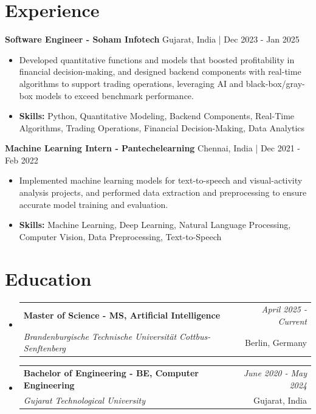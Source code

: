 \documentclass[a4paper,11pt]{article}
\makeatletter
\newcommand{\resumeSubheading}[4]{
\vspace{0.5mm}\item
    \begin{tabular*}{\linewidth}[t]{l@{\extracolsep{\fill}}r}
        \textbf{#1} & \textit{\footnotesize{#4}} \\
        \textit{\footnotesize{#3}} &  \footnotesize{#2}\\
    \end{tabular*}
    \vspace{-2.4mm}
}
\makeatother
\begin{document}
\section{\textbf{Experience}}


\vspace{1mm}
  \textbf{Software Engineer - Soham Infotech} \hfill Gujarat, India | Dec 2023 - Jan 2025
\vspace{-1.5mm} %
\begin{itemize}
  \item Developed quantitative functions and models that boosted profitability in financial decision-making, and designed backend components with real-time algorithms to support trading operations, leveraging AI and black-box/gray-box models to exceed benchmark performance.

\vspace{-2mm}
  \item \textbf{Skills:} Python, Quantitative Modeling, Backend Components, Real-Time Algorithms, Trading Operations, Financial Decision-Making, Data Analytics
\end{itemize}

\vspace{1mm}
  \textbf{Machine Learning Intern - Pantechelearning} \hfill Chennai, India | Dec 2021 - Feb 2022
\vspace{-1.5mm} %
\begin{itemize}
  \item Implemented machine learning models for text-to-speech and visual-activity analysis projects, and performed data extraction and preprocessing to ensure accurate model training and evaluation.
\vspace{-2mm}
  \item \textbf{Skills:} Machine Learning, Deep Learning, Natural Language Processing, Computer Vision, Data Preprocessing, Text-to-Speech
\end{itemize}\section{\textbf{Education}}
\vspace{-0.4mm}

\begin{itemize}[leftmargin=0.15in, label={}]
\resumeSubheading
{Master of Science - MS, Artificial Intelligence }{Berlin, Germany}
{Brandenburgische Technische Universität Cottbus-Senftenberg  }{April 2025 - Current}

\vspace{1.0mm} %
\resumeSubheading
{Bachelor of Engineering - BE, Computer Engineering  }{Gujarat, India}
{Gujarat Technological University }{June 2020 - May 2024}

\end{itemize}
\end{document}
